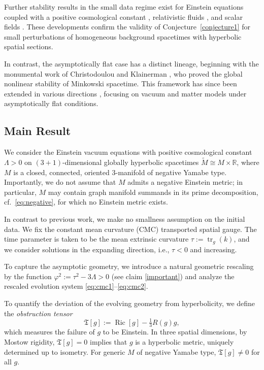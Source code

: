 \documentclass{amsart}
\begin{document}
\noindent Further stability results in the small data regime exist for Einstein equations coupled with a positive cosmological constant \cite{fajman2020stable, fajman2018cmc, mondal2019attractors}, relativistic fluids \cite{oliynyk2016future, oliynyk2021future, hadvzic2015global, lefloch2021nonlinear, mondal2024nonlinear}, and scalar fields \cite{wang, fajman2021attractors}. These developments confirm the validity of Conjecture~\ref{conjecture1} for small perturbations of homogeneous background spacetimes with hyperbolic spatial sections.

\noindent In contrast, the asymptotically flat case has a distinct lineage, beginning with the monumental work of Christodoulou and Klainerman \cite{christodoulou1993global}, who proved the global nonlinear stability of Minkowski spacetime. This framework has since been extended in various directions \cite{lindblad2010global, lefloch2016global, fajman2021stability, taylor, mondal2024global}, focusing on vacuum and matter models under asymptotically flat conditions.

 


\subsection{Main Result}

\noindent We consider the Einstein vacuum equations with positive cosmological constant $\Lambda > 0$ on $(3+1)$-dimensional globally hyperbolic spacetimes $\widetilde{M} \cong M \times \mathbb{R}$, where $M$ is a closed, connected, oriented $3$-manifold of negative Yamabe type. Importantly, we do not assume that $M$ admits a negative Einstein metric; in particular, $M$ may contain graph manifold summands in its prime decomposition, cf.~\eqref{eq:negative}, for which no Einstein metric exists.

\noindent In contrast to previous work, we make no smallness assumption on the initial data. We fix the constant mean curvature (CMC) transported spatial gauge. The time parameter is taken to be the mean extrinsic curvature $\tau := \operatorname{tr}_{g}(k)$, and we consider solutions in the expanding direction, i.e., $\tau < 0$ and increasing. 

\noindent To capture the asymptotic geometry, we introduce a natural geometric rescaling by the function $\varphi^2 := \tau^2 - 3\Lambda > 0$ (see claim \ref{important}) and analyze the rescaled evolution system \eqref{eq:cmc1}--\eqref{eq:cmc2}. 

\noindent To quantify the deviation of the evolving geometry from hyperbolicity, we define the \emph{obstruction tensor}
\[
\mathfrak{T}[g] := \operatorname{Ric}[g] - \tfrac{1}{3} R(g) g,
\]
which measures the failure of $g$ to be Einstein. In three spatial dimensions, by Mostow rigidity, $\mathfrak{T}[g] = 0$ implies that $g$ is a hyperbolic metric, uniquely determined up to isometry. For generic $M$ of negative Yamabe type, $\mathfrak{T}[g] \neq 0$ for all $g$.
\end{document}
